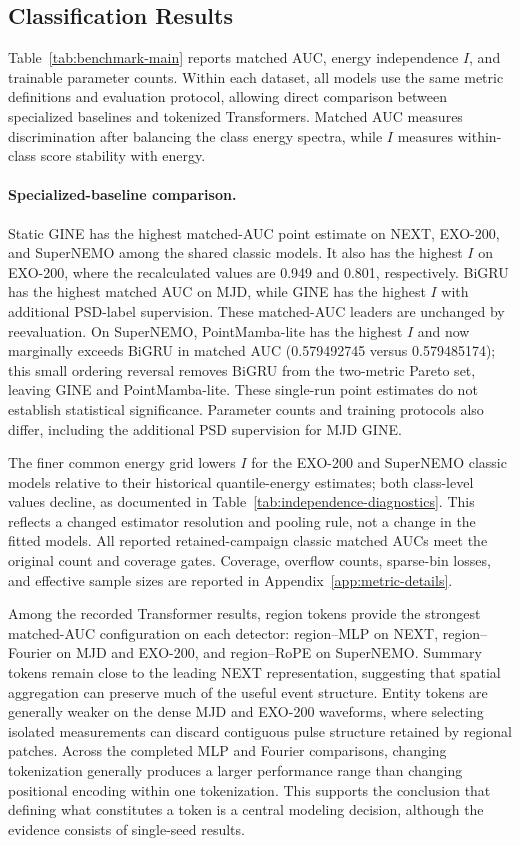 \subsection{Classification Results}
\label{sec:wing-results}

Table~\ref{tab:benchmark-main} reports matched AUC, energy independence $I$,
and trainable parameter counts. Within each dataset, all models use the same
metric definitions and evaluation protocol, allowing direct comparison
between specialized baselines and tokenized Transformers. Matched AUC
measures discrimination after balancing the class energy spectra, while $I$
measures within-class score stability with energy.


\paragraph{Specialized-baseline comparison.}
Static GINE has the highest matched-AUC point estimate on NEXT, EXO-200,
and SuperNEMO among the shared classic models. It also has the highest $I$
on EXO-200, where the recalculated values are 0.949 and 0.801, respectively.
BiGRU has the highest matched AUC on MJD, while GINE has the highest $I$
with additional PSD-label supervision.
These matched-AUC leaders are unchanged by reevaluation. On SuperNEMO,
PointMamba-lite has the highest $I$ and now marginally exceeds BiGRU in
matched AUC (0.579492745 versus 0.579485174); this small ordering reversal
removes BiGRU from the two-metric Pareto set, leaving GINE and PointMamba-lite.
These single-run point estimates do not establish statistical significance.
Parameter counts and training protocols also
differ, including the additional PSD supervision for MJD GINE.

The finer common energy grid lowers $I$ for the EXO-200 and SuperNEMO
classic models relative to their historical quantile-energy estimates;
both class-level values decline, as documented in
Table~\ref{tab:independence-diagnostics}. This reflects a changed estimator
resolution and pooling rule, not a change in the fitted models.
All reported retained-campaign classic matched AUCs meet the original count and
coverage gates. Coverage, overflow counts, sparse-bin losses, and effective
sample sizes are reported in Appendix~\ref{app:metric-details}.

Among the recorded Transformer results, region tokens provide the strongest
matched-AUC configuration on each detector: region--MLP on NEXT,
region--Fourier on MJD and EXO-200, and region--RoPE on SuperNEMO. Summary
tokens remain close to the leading NEXT representation, suggesting that
spatial aggregation can preserve much of the useful event structure. Entity
tokens are generally weaker on the dense MJD and EXO-200 waveforms, where
selecting isolated measurements can discard contiguous pulse structure
retained by regional patches. Across the completed MLP and Fourier
comparisons, changing tokenization generally produces a larger performance
range than changing positional encoding within one tokenization. This
supports the conclusion that defining what constitutes a token is a central
modeling decision, although the evidence consists of single-seed results.

